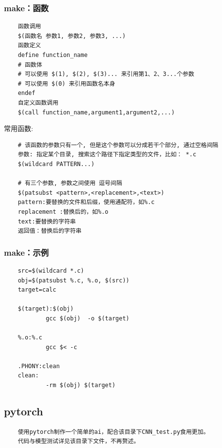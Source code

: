 \documentclass[UTF8]{ctexart}
\begin{document}
\subsubsection{make：函数}
\begin{verbatim}
	函数调用
	$(函数名 参数1, 参数2, 参数3, ...)
	函数定义
	define function_name
	# 函数体
	# 可以使用 $(1), $(2), $(3)... 来引用第1、2、3...个参数
	# 可以使用 $(0) 来引用函数名本身
	endef
	自定义函数调用
	$(call function_name,argument1,argument2,...)
\end{verbatim}
常用函数:
\begin{verbatim}
	# 该函数的参数只有一个, 但是这个参数可以分成若干个部分, 通过空格间隔
	参数:	指定某个目录, 搜索这个路径下指定类型的文件，比如： *.c
	$(wildcard PATTERN...)

	# 有三个参数, 参数之间使用 逗号间隔
	$(patsubst <pattern>,<replacement>,<text>)
	pattern:要替换的文件和后缀，使用通配符，如%.c
	replacement :替换后的，如%.o
	text:要替换的字符串
	返回值：替换后的字符串
\end{verbatim}


\subsubsection{make：示例}
\begin{lstlisting}
	src=$(wildcard *.c)
	obj=$(patsubst %.c, %.o, $(src))
	target=calc

	$(target):$(obj)
			gcc $(obj)  -o $(target)

	%.o:%.c
			gcc $< -c

	.PHONY:clean
	clean:
        	-rm $(obj) $(target) 		
\end{lstlisting}


\subsection{pytorch}
\begin{verbatim}
	使用pytorch制作一个简单的ai，配合该目录下CNN_test.py食用更加。
	代码与模型测试详见该目录下文件，不再赘述。
\end{verbatim}
\end{document}
